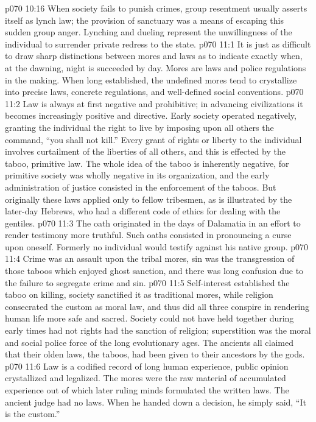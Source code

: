 \vs p070 10:16 When society fails to punish crimes, group resentment usually asserts itself as lynch law; the provision of sanctuary was a means of escaping this sudden group anger. Lynching and dueling represent the unwillingness of the individual to surrender private redress to the state.
\vs p070 11:1 It is just as difficult to draw sharp distinctions between mores and laws as to indicate exactly when, at the dawning, night is succeeded by day. Mores are laws and police regulations in the making. When long established, the undefined mores tend to crystallize into precise laws, concrete regulations, and well\hyp{}defined social conventions.
\vs p070 11:2 Law is always at first negative and prohibitive; in advancing civilizations it becomes increasingly positive and directive. Early society operated negatively, granting the individual the right to live by imposing upon all others the command, “you shall not kill.” Every grant of rights or liberty to the individual involves curtailment of the liberties of all others, and this is effected by the taboo, primitive law. The whole idea of the taboo is inherently negative, for primitive society was wholly negative in its organization, and the early administration of justice consisted in the enforcement of the taboos. But originally these laws applied only to fellow tribesmen, as is illustrated by the later\hyp{}day Hebrews, who had a different code of ethics for dealing with the gentiles.
\vs p070 11:3 The oath originated in the days of Dalamatia in an effort to render testimony more truthful. Such oaths consisted in pronouncing a curse upon oneself. Formerly no individual would testify against his native group.
\vs p070 11:4 \pc Crime was an assault upon the tribal mores, sin was the transgression of those taboos which enjoyed ghost sanction, and there was long confusion due to the failure to segregate crime and sin.
\vs p070 11:5 Self\hyp{}interest established the taboo on killing, society sanctified it as traditional mores, while religion consecrated the custom as moral law, and thus did all three conspire in rendering human life more safe and sacred. Society could not have held together during early times had not rights had the sanction of religion; superstition was the moral and social police force of the long evolutionary ages. The ancients all claimed that their olden laws, the taboos, had been given to their ancestors by the gods.
\vs p070 11:6 Law is a codified record of long human experience, public opinion crystallized and legalized. The mores were the raw material of accumulated experience out of which later ruling minds formulated the written laws. The ancient judge had no laws. When he handed down a decision, he simply said, “It is the custom.”
